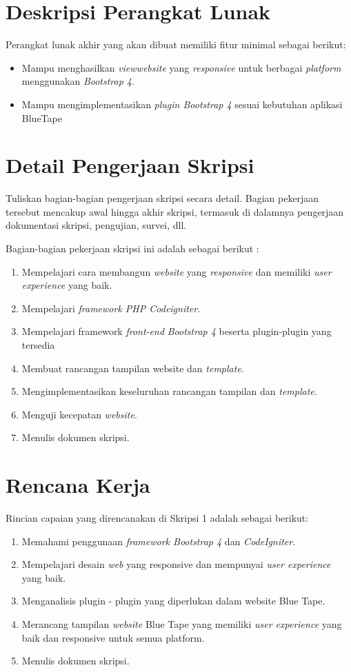 \documentclass[a4paper,twoside]{article}
\begin{document}
		


\section{Deskripsi Perangkat Lunak}

Perangkat lunak akhir yang akan dibuat memiliki fitur minimal sebagai berikut:
\begin{itemize}
	\item Mampu menghasilkan \textit{view}\textit{website} yang \textit{responsive} untuk berbagai \textit{platform} menggunakan \textit{Bootstrap 4}.
	\item Mampu mengimplementasikan \textit{plugin Bootstrap 4} sesuai kebutuhan aplikasi BlueTape	
		
\end{itemize}

\section{Detail Pengerjaan Skripsi}
Tuliskan bagian-bagian pengerjaan skripsi secara detail. Bagian pekerjaan tersebut mencakup awal hingga akhir skripsi, termasuk di dalamnya pengerjaan dokumentasi skripsi, pengujian, survei, dll.

Bagian-bagian pekerjaan skripsi ini adalah sebagai berikut :
	\begin{enumerate}
		\item Mempelajari cara membangun \textit{website} yang \textit{responsive} dan memiliki \textit{user experience }yang baik.  
		\item Mempelajari \textit{framework PHP Codeigniter}.
		\item Mempelajari framework \textit{front-end} \textit{Bootstrap 4} beserta plugin-plugin yang tersedia
		\item Membuat rancangan tampilan website dan \textit{template}.
		\item Mengimplementasikan keseluruhan rancangan tampilan dan \textit{template}.
		\item Menguji kecepatan \textit{website}.
		\item Menulis dokumen skripsi.
	\end{enumerate}

\section{Rencana Kerja}
Rincian capaian yang direncanakan di Skripsi 1 adalah sebagai berikut:
\begin{enumerate}
\item Memahami penggunaan \textit{framework Bootstrap 4} dan \textit{CodeIgniter}.
\item Mempelajari desain \textit{web} yang responsive dan mempunyai \textit{user experience} yang baik.
\item Menganalisis plugin - plugin yang diperlukan dalam website Blue Tape.
\item Merancang tampilan \textit{website} Blue Tape yang memiliki \textit{user experience} yang baik dan responsive untuk semua platform.
\item Menulis dokumen skripsi.
\end{enumerate}
\end{document}
